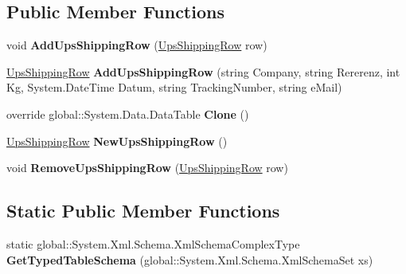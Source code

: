 \subsection*{Public Member Functions}
\begin{DoxyCompactItemize}
\item 
void {\bfseries Add\+Ups\+Shipping\+Row} (\hyperlink{class_products_1_1_data_1_1ds_sage_1_1_ups_shipping_row}{Ups\+Shipping\+Row} row)\hypertarget{class_products_1_1_data_1_1ds_sage_1_1_ups_shipping_data_table_acaf586f55672705d0b459f991a07427c}{}\label{class_products_1_1_data_1_1ds_sage_1_1_ups_shipping_data_table_acaf586f55672705d0b459f991a07427c}

\item 
\hyperlink{class_products_1_1_data_1_1ds_sage_1_1_ups_shipping_row}{Ups\+Shipping\+Row} {\bfseries Add\+Ups\+Shipping\+Row} (string Company, string Rererenz, int Kg, System.\+Date\+Time Datum, string Tracking\+Number, string e\+Mail)\hypertarget{class_products_1_1_data_1_1ds_sage_1_1_ups_shipping_data_table_a1b4e5d4b5d4158b2316d1ab1377e324c}{}\label{class_products_1_1_data_1_1ds_sage_1_1_ups_shipping_data_table_a1b4e5d4b5d4158b2316d1ab1377e324c}

\item 
override global\+::\+System.\+Data.\+Data\+Table {\bfseries Clone} ()\hypertarget{class_products_1_1_data_1_1ds_sage_1_1_ups_shipping_data_table_af262830e450eee08785cb32db505a6e0}{}\label{class_products_1_1_data_1_1ds_sage_1_1_ups_shipping_data_table_af262830e450eee08785cb32db505a6e0}

\item 
\hyperlink{class_products_1_1_data_1_1ds_sage_1_1_ups_shipping_row}{Ups\+Shipping\+Row} {\bfseries New\+Ups\+Shipping\+Row} ()\hypertarget{class_products_1_1_data_1_1ds_sage_1_1_ups_shipping_data_table_a5f32125499d37e46ef2332a2a6b7b13c}{}\label{class_products_1_1_data_1_1ds_sage_1_1_ups_shipping_data_table_a5f32125499d37e46ef2332a2a6b7b13c}

\item 
void {\bfseries Remove\+Ups\+Shipping\+Row} (\hyperlink{class_products_1_1_data_1_1ds_sage_1_1_ups_shipping_row}{Ups\+Shipping\+Row} row)\hypertarget{class_products_1_1_data_1_1ds_sage_1_1_ups_shipping_data_table_a1b474ce74e094e1005eccce1e264eab5}{}\label{class_products_1_1_data_1_1ds_sage_1_1_ups_shipping_data_table_a1b474ce74e094e1005eccce1e264eab5}

\end{DoxyCompactItemize}
\subsection*{Static Public Member Functions}
\begin{DoxyCompactItemize}
\item 
static global\+::\+System.\+Xml.\+Schema.\+Xml\+Schema\+Complex\+Type {\bfseries Get\+Typed\+Table\+Schema} (global\+::\+System.\+Xml.\+Schema.\+Xml\+Schema\+Set xs)\hypertarget{class_products_1_1_data_1_1ds_sage_1_1_ups_shipping_data_table_a9126aa4e38f940ad2932faad5ba776c7}{}\label{class_products_1_1_data_1_1ds_sage_1_1_ups_shipping_data_table_a9126aa4e38f940ad2932faad5ba776c7}

\end{DoxyCompactItemize}
